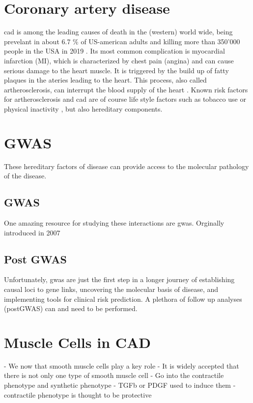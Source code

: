 \section{Coronary artery disease}
\label{sec:cad}
\ac{cad} is among the leading causes of death in the (western) world wide, being prevelant in about 6.7 \% of US-american adults and killing more than 350'000 people in the USA in 2019 \cite{cdcHeartDiseaseFacts2022, fryarPrevalenceUncontrolledRisk2012}. Its most common complication is myocardial infarction (MI), which is characterized by chest pain (angina) and can cause serious damage to the heart muscle. It is triggered by the build up of fatty plaques in the ateries leading to the heart. This process, also called artherosclerosis, can interrupt the blood supply of the heart \cite{HeartAttack2017}. Known risk factors for artherosclerosis and \ac{cad} are of course life style factors such as tobacco use or physical inactivity \cite{taskforcemembers2013ESCGuidelines2013}, but also hereditary components.

\section{GWAS}
\label{sec:gwas}
These hereditary factors of disease can provide access to the molecular pathology of the disease.

    \subsection{GWAS}
    \label{subsec:gwas_general}
    One amazing resource for studying these interactions are \ac{gwas}. Orginally introduced in 2007

    \subsection{Post GWAS}
    \label{subsec:gwas_limit}
    Unfortunately, \ac{gwas} are just the first step in a longer journey of establishing causal loci to gene links, uncovering the molecular basis of disease, and implementing tools for clinical risk prediction. A plethora of follow up analyses (postGWAS) can and need to be performed.

\section{Muscle Cells in CAD}
\label{sec:haosms}
- We now that smooth muscle cells play a key role
- It is widely accepted that there is not only one type of smooth muscle cell
- Go into the contractile phenotype and synthetic phenotype
    - TGFb or PDGF used to induce them
    - contractile phenotype is thought to be protective

